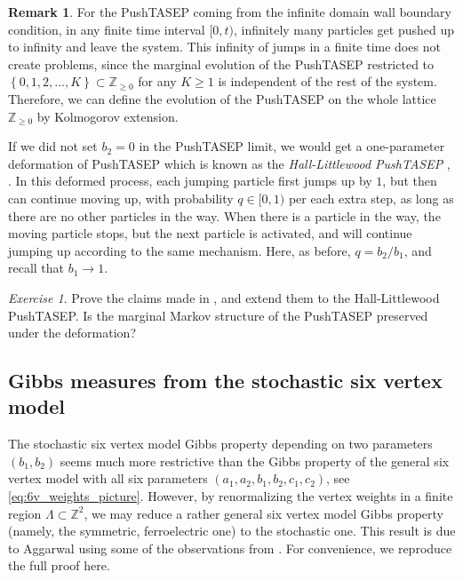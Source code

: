 \documentclass[letterpaper,11pt,oneside,reqno]{article}
\numberwithin{equation}{section}
\theoremstyle{definition}
\newtheorem{remark}[proposition]{Remark}
\theoremstyle{remark}
\newtheorem{exercise}{Exercise}[section]
\begin{document}
\begin{remark}
	\label{rmk:PushTASEP_inf_jumps}
	For the PushTASEP coming from the infinite domain wall boundary condition, in any finite
	time interval $[0,t)$, infinitely many particles get pushed up to infinity and leave the system. 
	This infinity of jumps in a finite time does not create problems, since 
	the marginal evolution of the PushTASEP restricted to $\left\{ 0,1,2,\ldots,K  \right\}\subset\mathbb{Z}_{\ge0}$
	for any $K\ge1$ is independent of the rest of the system. Therefore, we can define the 
	evolution of the PushTASEP on the whole lattice $\mathbb{Z}_{\ge0}$
	by Kolmogorov extension.
\end{remark}

If we did not set $b_2=0$ in the PushTASEP limit, 
we would get a one-parameter deformation of PushTASEP
which is known as the \emph{Hall-Littlewood PushTASEP}
\cite{BorodinBufetovWheeler2016},
\cite{Ghosal2017KPZ}.
In this deformed process, each jumping particle first jumps up by $1$, but then can 
continue moving up, with probability $q\in[0,1)$ per each extra step,
as long as there are no other particles in the way. When 
there is a particle in the way, the moving particle 
stops, but the next particle is activated, and will continue 
jumping up according to the same mechanism.
Here, as before, $q=b_2/b_1$, and recall that $b_1\to1$.

\begin{exercise}
	Prove the claims made in , and 
	extend them to the Hall-Littlewood PushTASEP. Is the marginal Markov
	structure of the PushTASEP preserved under the deformation?
\end{exercise}


\subsection{Gibbs measures from the stochastic six vertex model}
\label{sub:Gibbs_s6v}

The stochastic six vertex model Gibbs property
depending on two parameters $(b_1,b_2)$
seems much more restrictive than the 
Gibbs property of the general six vertex model
with all six parameters
$(a_1,a_2,b_1,b_2,c_1,c_2)$, 
see \eqref{eq:6v_weights_picture}.
However, by renormalizing the vertex weights
in a finite region $\Lambda\subset\mathbb{Z}^{2}$,
we may reduce a rather general six vertex model Gibbs property 
(namely, the symmetric, ferroelectric one)
to the 
stochastic one.
This result is due to Aggarwal \cite[Appendix A.1]{Amol2016Stationary}
using some of the observations from \cite{BorodinBufetov2015}.
For convenience, we reproduce the full proof here.
\end{document}
